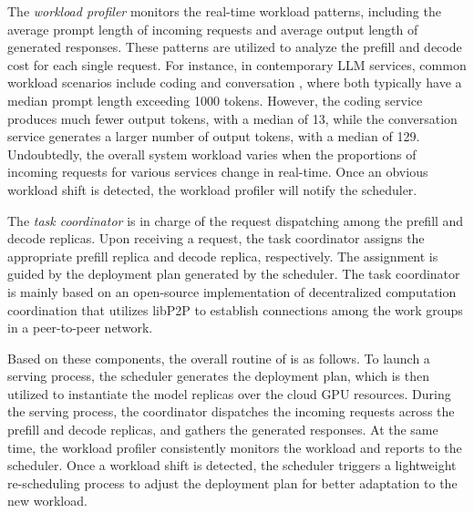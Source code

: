 The \textit{workload profiler} monitors the real-time workload patterns, including the average prompt length of incoming requests and average output length of generated responses. These patterns are utilized to analyze the prefill and decode cost for each single request. 
For instance,  in contemporary LLM services, common workload scenarios include coding and conversation \cite{patel2023splitwise}, where both typically have a median prompt length exceeding 1000 tokens. However, the coding service produces much fewer output tokens, with a median of 13, while the conversation service generates a larger number of output tokens, with a median of 129. Undoubtedly, the overall system workload varies when the proportions of incoming requests for various services change in real-time.
Once an obvious workload shift is detected, the workload profiler will notify the scheduler. 


The \textit{task coordinator} is in charge of the request dispatching among the prefill and decode replicas. 
Upon receiving a request, the task coordinator assigns the appropriate prefill replica and decode replica, respectively. The assignment is guided by the deployment plan generated by the scheduler.
The task coordinator is mainly based on an open-source implementation of decentralized computation coordination \cite{yao2023open} that utilizes libP2P \cite{libp2p} to establish connections among the work groups in a peer-to-peer network.

Based on these components, the overall routine of \sys is as follows.
 To launch a serving process, the scheduler generates the deployment plan, which is then utilized to instantiate the model replicas over the cloud GPU resources. 
 During the serving process, the coordinator dispatches the incoming requests across the prefill and decode replicas, and gathers the generated responses. 
 At the same time, the workload profiler consistently monitors the workload and reports to the scheduler. 
 Once a workload shift is detected, the scheduler triggers a lightweight re-scheduling process to adjust the deployment plan for better adaptation to the new workload.

